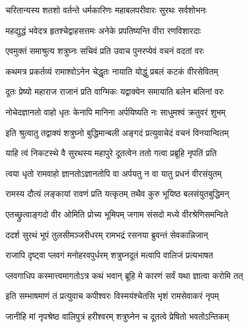 \twolineshloka
{चरितान्यस्य शतशो वर्तन्ते धर्मकारिणः}
{महाबलपरीवारः सुरथः सर्वशोभनः}%

\twolineshloka
{महद्युद्धं भवेदत्र हृतश्चेद्वाहसत्तमः}
{अनेके प्रपतिष्यन्ति वीरा रणविशारदाः}%

\twolineshloka
{एवमुक्तं समाश्रुत्य शत्रुघ्नः सचिवं प्रति}
{उवाच पुनरप्येवं वचनं वदतां वरः}%


\twolineshloka
{कथमत्र प्रकर्तव्यं रामाश्वोऽनेन चेद्धृतः}
{नायाति योद्धुं प्रबलं कटकं वीरसेवितम्}%


\twolineshloka
{दूतः प्रेष्यो महाराज राजानं प्रति वाग्मिकः}
{यद्वाक्येन समायाति बलेन बलिनां वरः}%

\twolineshloka
{नोचेदज्ञानतो वाहो धृतः केनापि मानिना}
{अर्पयिष्यति नः साधुमश्वं क्रतुवरं शुभम्}%

\twolineshloka
{इति श्रुत्वातु तद्वाक्यं शत्रुघ्नो बुद्धिमान्बली}
{अङ्गदं प्रत्युवाचेदं वचनं विनयान्वितम्}%


\twolineshloka
{याहि त्वं निकटस्थे वै सुरथस्य महापुरे}
{दूतत्वेन ततो गत्वा प्रब्रूहि नृपतिं प्रति}%

\twolineshloka
{त्वया धृतो रामवाहो ज्ञानतोऽज्ञानतोपि वा}
{अर्पयतु न वा यातु प्रधनं वीरसंयुतम्}%

\twolineshloka
{रामस्य दौत्यं लङ्कायां रावणं प्रति यत्कृतम्}
{तथैव कुरु भूयिष्ठ बलसंयुतबुद्धिमन्}%


\twolineshloka
{एतच्छ्रुत्वाङ्गदो वीर ओमिति प्रोच्य भूमिपम्}
{जगाम संसदो मध्ये वीरश्रेणिसमन्विते}%

\twolineshloka
{ददर्श सुरथं भूपं तुलसीमञ्जरीधरम्}
{रामभद्रं रसनया ब्रुवन्तं सेवकान्निजान्}%

\twolineshloka
{राजापि दृष्ट्वा प्लवगं मनोहरवपुर्धरम्}
{शत्रुघ्नदूतं मत्वापि वालिजं प्रत्यभाषत}%


\twolineshloka
{प्लवगाधिप कस्मात्त्वमागतोऽत्र कथं भवान्}
{ब्रूहि मे कारणं सर्वं यथा ज्ञात्वा करोमि तत्}%


\twolineshloka
{इति सम्भाषमाणं तं प्रत्युवाच कपीश्वरः}
{विस्मयंश्चेतसि भृशं रामसेवाकरं नृपम्}%

\twolineshloka
{जानीहि मां नृपश्रेष्ठ वालिपुत्रं हरीश्वरम्}
{शत्रुघ्नेन च दूतत्वे प्रेषितो भवतोऽन्तिकम्}%

